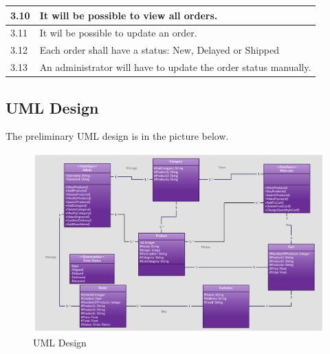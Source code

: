 \documentclass[a4paper,12pt]{article}
\begin{document}
\begin{tabular}{|l|l|}
		3.10 & It will be possible to view all orders.                                                                                                                                                      \\ \hline
		3.11 & It wil be possible to update an order.                                                                                                                                                       \\ \hline
		3.12 & Each order shall have a status: New, Delayed or Shipped                                                                                                                                      \\ \hline
		3.13 & An administrator will have to  update the order status manually.                                                                                                                             \\ \hline
	\end{tabular}

\subsection{UML Design}
The preliminary UML design is in the picture below.
\begin{figure}[htbp]
	\caption{UML Design}
	\includegraphics[width=\textwidth,height=\textheight,keepaspectratio]{img/UML.png}
\end{figure}
\end{document}

